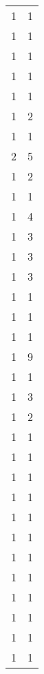 \begin{tabular}{rr}
                  1 &             1 \\
                  1 &             1 \\
                  1 &             1 \\
                  1 &             1 \\
                  1 &             1 \\
                  1 &             2 \\
                  1 &             1 \\
                  2 &             5 \\
                  1 &             2 \\
                  1 &             1 \\
                  1 &             4 \\
                  1 &             3 \\
                  1 &             3 \\
                  1 &             3 \\
                  1 &             1 \\
                  1 &             1 \\
                  1 &             1 \\
                  1 &             9 \\
                  1 &             1 \\
                  1 &             3 \\
                  1 &             2 \\
                  1 &             1 \\
                  1 &             1 \\
                  1 &             1 \\
                  1 &             1 \\
                  1 &             1 \\
                  1 &             1 \\
                  1 &             1 \\
                  1 &             1 \\
                  1 &             1 \\
                  1 &             1 \\
                  1 &             1 \\
                  1 &             1 \\

\end{tabular}
